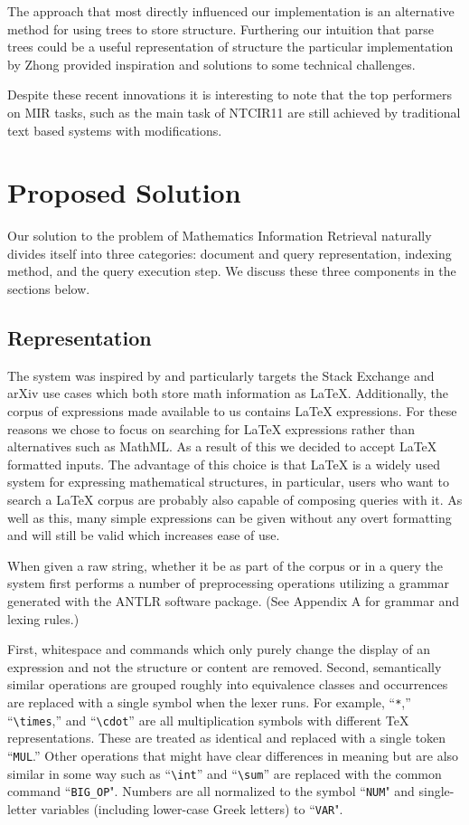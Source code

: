 \documentclass{sig-alternate}
\begin{document}
The approach that most directly influenced our implementation is an
alternative method for using trees to store structure. Furthering our
intuition that parse trees could be a useful representation of structure
the particular implementation by Zhong provided inspiration and 
solutions to some technical challenges.\cite{zhong:cowpie}

Despite these recent innovations it is interesting to note that the top performers on 
MIR tasks, such as the main task of NTCIR11 are still achieved by traditional text based
systems with modifications.

\section{Proposed Solution}
Our solution to the problem of Mathematics Information Retrieval naturally divides itself into three categories: document and query representation, indexing method, and the query execution step.  We discuss these three components in the sections below.

\subsection{Representation}
The system was inspired by and particularly targets the Stack Exchange
and arXiv use cases which both store math information as \LaTeX{}. 
Additionally, the corpus of expressions made available to us contains
\LaTeX{} expressions. For these reasons we chose to focus on searching
for \LaTeX{} expressions rather than alternatives such as MathML. As a 
result of this we decided to accept \LaTeX{} formatted inputs. The advantage
of this choice is that \LaTeX{} is a widely used system for expressing
mathematical structures, in particular, users who want to search
a \LaTeX{} corpus are probably also capable of composing queries with it.
As well as this, many simple expressions can be given without any 
overt formatting and will still be valid which increases ease of use.

When given a raw string, whether it be as part of the corpus or in 
a query the system first performs a number of preprocessing operations utilizing a grammar
generated with the ANTLR software package.  (See Appendix A for 
grammar and lexing rules.)

First, whitespace and commands which only purely change the display of an
expression and not the structure or content are removed. Second, 
semantically similar operations are grouped roughly into equivalence 
classes and occurrences are replaced with a single symbol when the lexer runs.
For example, ``\texttt{*},'' ``\texttt{\textbackslash times},'' and ``\texttt{\textbackslash cdot}'' are all multiplication symbols with different \TeX{} representations.  These are treated as identical and replaced with a single token ``\texttt{MUL}.'' Other operations that might have clear differences in meaning but are also
similar in some way such as ``\texttt{\textbackslash int}'' and ``\texttt{\textbackslash sum}'' are replaced with the common command ``\texttt{BIG\_OP}". Numbers are all normalized to the symbol ``\texttt{NUM}" and single-letter variables (including lower-case Greek letters) to ``\texttt{VAR}".
\end{document}
